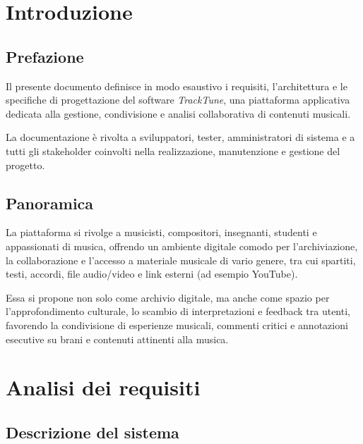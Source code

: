 \documentclass[a4paper]{article}
\begin{document}


\tableofcontents
\pagebreak

\section{Introduzione}

\subsection{Prefazione}

Il presente documento definisce in modo esaustivo i requisiti, l'architettura e le specifiche di progettazione del software \textit{TrackTune},
una piattaforma applicativa dedicata alla gestione, condivisione e analisi 
collaborativa di contenuti musicali.

\bigskip

La documentazione è rivolta a sviluppatori, tester, amministratori di sistema e a 
tutti gli stakeholder coinvolti nella realizzazione, manutenzione e gestione del 
progetto.

\subsection{Panoramica}

La piattaforma si rivolge a musicisti, compositori, insegnanti, studenti e appassionati
di musica, offrendo un ambiente digitale comodo per l’archiviazione, la collaborazione 
e l’accesso a materiale musicale di vario genere, tra cui spartiti, testi, accordi, 
file audio/video e link esterni (ad esempio YouTube).

Essa si propone non solo come archivio digitale, 
ma anche come spazio per l’approfondimento culturale, 
lo scambio di interpretazioni e feedback tra utenti, favorendo la condivisione 
di esperienze musicali, commenti critici e annotazioni esecutive su brani e 
contenuti attinenti alla musica.

\section{Analisi dei requisiti}

\subsection{Descrizione del sistema}
\end{document}
